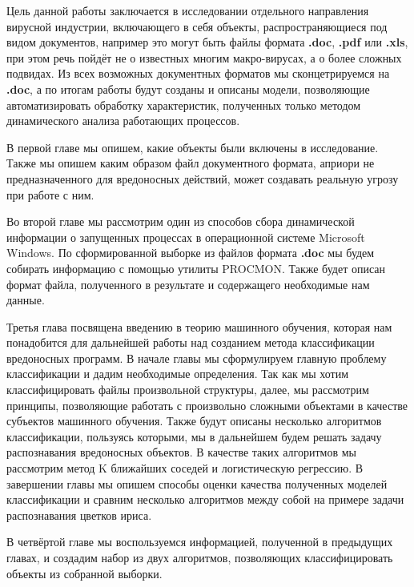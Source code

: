 Цель данной работы заключается в исследовании отдельного направления вирусной индустрии, включающего в себя объекты, распространяющиеся под видом документов, например это могут быть файлы формата \textbf{.doc}, \textbf{.pdf} или \textbf{.xls}, при этом речь пойдёт не о известных многим макро-вирусах, а о более сложных подвидах.
Из всех возможных документных форматов мы сконцетрируемся на \textbf{.doc}, а по итогам работы будут созданы и описаны модели, позволяющие автоматизировать обработку характеристик, полученных только методом динамического анализа работающих процессов.

В первой главе мы опишем, какие объекты были включены в исследование.
Также мы опишем каким образом файл документного формата, априори не предназначенного для вредоносных действий, может создавать реальную угрозу при работе с ним.

Во второй главе мы рассмотрим один из способов сбора динамической информации о запущенных процессах в операционной системе Microsoft Windows. 
По сформированной выборке из файлов формата \textbf{.doc} мы будем собирать информацию с помощью утилиты PROCMON.
Также будет описан формат файла, полученного в результате и содержащего необходимые нам данные.

Третья глава посвящена введению в теорию машинного обучения, которая нам понадобится для дальнейшей работы над созданием метода классификации вредоносных программ. В начале главы мы сформулируем главную проблему классификации и дадим необходимые определения. Так как мы хотим классифицировать файлы произвольной структуры, далее, мы рассмотрим принципы, позволяющие работать с произвольно сложными объектами в качестве субъектов машинного обучения. Также будут описаны несколько алгоритмов классификации, пользуясь которыми, мы в дальнейшем будем решать задачу распознавания вредоносных объектов. В качестве таких алгоритмов мы рассмотрим метод K ближайших соседей и логистическую регрессию.  В завершении главы мы опишем способы оценки качества полученных моделей классификации и сравним несколько алгоритмов между собой на примере задачи распознавания цветков ириса.

В четвёртой главе мы воспользуемся информацией, полученной в предыдущих главах, и создадим набор из двух алгоритмов, позволяющих классифицировать объекты из собранной выборки.

